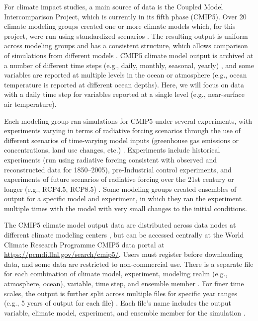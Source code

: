 For climate impact studies, a main source of data is the Coupled Model
Intercomparison Project, which is currently in its fifth phase (CMIP5).
Over 20 climate modeling groups created one or more climate models
which, for this project, were run using standardized scenarios
\citep{taylor2012overview}. The resulting output is uniform across
modeling groups and has a consistent structure, which allows comparison
of simulations from different models \citep{IPCCch9}. CMIP5 climate
model output is archived at a number of different time steps (e.g.,
daily, monthly, seasonal, yearly) \citep{taylor2010cmip5}, and some
variables are reported at multiple levels in the ocean or atmosphere
(e.g., ocean temperature is reported at different ocean depths). Here,
we will focus on data with a daily time step for variables reported at a
single level (e.g., near-surface air temperature).

Each modeling group ran simulations for CMIP5 under several experiments,
with experiments varying in terms of radiative forcing scenarios through
the use of different scenarios of time-varying model inputs (greenhouse
gas emissions or concentrations, land use changes, etc.)
\citep{taylor2012overview, IPCCch9}. Experiments include historical
experiments (run using radiative forcing consistent with observed and
reconstructed data for 1850--2005), pre-Industrial control experiments,
and experiments of future scenarios of radiative forcing over the 21st
century or longer (e.g., RCP4.5, RCP8.5) \citep{taylor2012overview}.
Some modeling groups created ensembles of output for a specific model
and experiment, in which they ran the experiment multiple times with the
model with very small changes to the initial conditions.

The CMIP5 climate model output data are distributed across data nodes at
different climate modeling centers \citep{taylor2012overview}, but can
be accessed centrally at the World Climate Research Programme CMIP5 data
portal at \url{https://pcmdi.llnl.gov/search/cmip5/}. Users must
register before downloading data, and some data are restricted to
non-commercial use. There is a separate file for each combination of
climate model, experiment, modeling realm (e.g., atmosphere, ocean),
variable, time step, and ensemble member
\citep{taylor2012overview, taylor2010cmip5}. For finer time scales, the
output is further split across multiple files for specific year ranges
(e.g., 5 years of output for each file) \citep{taylor2010cmip5}. Each
file's name includes the output variable, climate model, experiment, and
ensemble member for the simulation \citep{taylor2010cmip5}.

